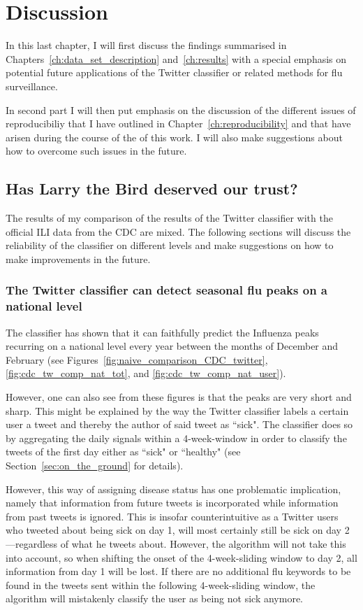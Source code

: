 \documentclass[11pt, a4paper,twoside]{report}\usepackage[]{graphicx}\usepackage[]{color}
\begin{document}
\thispagestyle{empty}
\cleardoublepage

\chapter{Discussion}
\label{ch:discussion}

In this last chapter, I will first discuss the findings summarised in Chapters~\ref{ch:data_set_description} and~\ref{ch:results} with a special emphasis on potential future applications of the Twitter classifier or related methods for flu surveillance.

In second part I will then put emphasis on the discussion of the different issues of reproducibiliy that I have outlined in Chapter~\ref{ch:reproducibility} and that have arisen during the course of the of this work. I will also make suggestions about how to overcome such issues in the future. 

\section{Has Larry the Bird deserved our trust?}
\label{sec:disc_data_set}

The results of my comparison of the results of the Twitter classifier with the official ILI data from the CDC are mixed. The following sections will discuss the reliability of the classifier on different levels and make suggestions on how to make improvements in the future.

\subsection{The Twitter classifier can detect seasonal flu peaks on a national level}
The classifier has shown that it can faithfully predict the Influenza peaks recurring on a national level every year between the months of December and February (see Figures~\ref{fig:naive_comparison_CDC_twitter}, \ref{fig:cdc_tw_comp_nat_tot}, and \ref{fig:cdc_tw_comp_nat_user}). 

However, one can also see from these figures is that the peaks are very short and sharp. This might be explained by the way the Twitter classifier labels a certain user a tweet and thereby the author of said tweet as ``sick". The classifier does so by aggregating the daily signals within a 4-week-window in order to classify the tweets of the first day either as ``sick" or ``healthy" (see Section~\ref{sec:on_the_ground} for details). 

However, this way of assigning disease status has one problematic implication, namely that information from future tweets is incorporated while information from past tweets is ignored. This is insofar counterintuitive as a Twitter users who tweeted about being sick on day 1, will most certainly still be sick on day 2---regardless of what he tweets about. However, the algorithm will not take this into account, so when shifting the onset of the 4-week-sliding window to day 2, all information from day 1 will be lost. If there are no additional flu keywords to be found in the tweets sent within the following 4-week-sliding window, the algorithm will mistakenly classify the user as being not sick anymore. 
\end{document}
